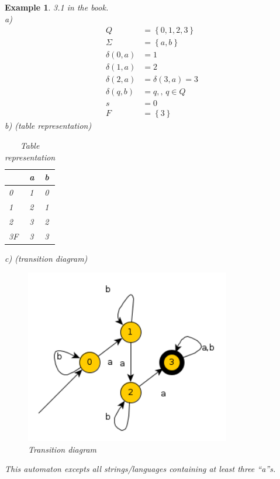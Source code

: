\documentclass[a4paper]{article}
\newtheorem{example}{Example}
\begin{document}
\begin{example}
    3.1 in the book.\\
    a)\\
\begin{align*}
    Q&=\left\{ 0,1,2,3 \right\}\\
    \Sigma&=\left\{ a,b \right\}\\
    \delta(0,a)&=1\\
    \delta(1,a)&=2\\
    \delta(2,a)&=\delta(3,a)=3\\
    \delta(q,b)&=q,\mbox{, }q\in Q\\
    s&=0\\
    F&=\left\{ 3 \right\}
\end{align*}
b) (table representation)
\begin{table}[H]
    \centering
    \begin{tabular}{l|l l}
        & a & b\\\hline
        0 & 1 & 0\\
        1 & 2 & 1 \\
        2 & 3 & 2 \\
        3F & 3 & 3
    \end{tabular}
    \caption{Table representation}
\end{table}
c) (transition diagram)
\begin{figure}[H]
    \centering
    \includegraphics[width=0.8\textwidth]{transition-diagram.png}
    \caption{Transition diagram}
\end{figure}
This automaton excepts all strings/languages containing at least three ``a''s.\\
\end{example}
\end{document}
